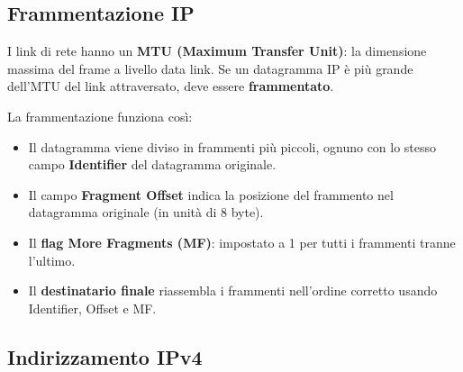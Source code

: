 \subsection{Frammentazione IP}

I link di rete hanno un \textbf{MTU (Maximum Transfer Unit)}: la dimensione massima del frame a livello data link. Se un datagramma IP è più grande dell'MTU del link attraversato, deve essere \textbf{frammentato}.

La frammentazione funziona così:
\begin{itemize}
    \item Il datagramma viene diviso in frammenti più piccoli, ognuno con lo stesso campo \textbf{Identifier} del datagramma originale.
    \item Il campo \textbf{Fragment Offset} indica la posizione del frammento nel datagramma originale (in unità di 8 byte).
    \item Il \textbf{flag More Fragments (MF)}: impostato a 1 per tutti i frammenti tranne l'ultimo.
    \item Il \textbf{destinatario finale} riassembla i frammenti nell'ordine corretto usando Identifier, Offset e MF.
\end{itemize}



\subsection{Indirizzamento IPv4}

